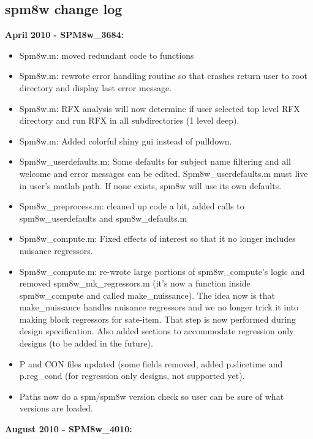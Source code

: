 \documentclass[12pt]{article}
\begin{document}
\subsection{spm8w change log}
\noindent
\textbf{April 2010 - SPM8w\_3684:}
\begin{itemize}
	\item Spm8w.m: moved redundant code to functions
	\item Spm8w.m: rewrote error handling routine so that crashes return user to root directory and display last error message.
	\item Spm8w.m: RFX analysis will now determine if user selected top level RFX directory and run RFX in all subdirectories (1 level deep). 
	\item Spm8w.m: Added colorful shiny gui instead of pulldown.
	\item Spm8w\_userdefaults.m: Some defaults for subject name filtering and all welcome and error messages can be edited. Spm8w\_userdefaults.m must live in user’s matlab path. If none exists, spm8w will use its own defaults.
	\item Spm8w\_preprocess.m: cleaned up code a bit, added calls to spm8w\_userdefaults and \newline spm8w\_defaults.m
	\item Spm8w\_compute.m: Fixed effects of interest so that it no longer includes nuisance regressors.
	\item Spm8w\_compute.m: re-wrote large portions of spm8w\_compute’s logic and removed \newline spm8w\_mk\_regressors.m (it’s now a function inside spm8w\_compute and called \newline make\_nuissance). The idea now is that make\_nuissance handles nuisance regressors and we no longer trick it into making block regressors for sate-item. That step is now performed during design specification. Also added sections to accommodate regression only designs (to be added in the future). 
	\item P and CON files updated (some fields removed, added p.slicetime and p.reg\_cond (for regression only designs, not supported yet). 
	\item Paths now do a spm/spm8w version check so user can be sure of what versions are loaded.
\end{itemize}
\noindent
\textbf{August 2010 - SPM8w\_4010:}
\end{document}
